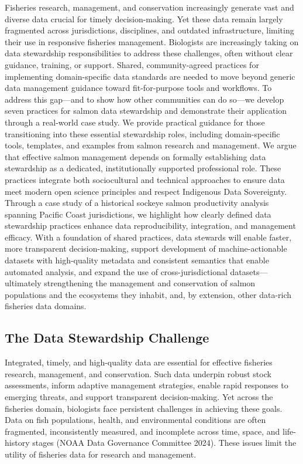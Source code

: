 \documentclass[
  letterpaper,
  DIV=11,
  numbers=noendperiod]{scrartcl}
\begin{document}
Fisheries research, management, and conservation increasingly generate
vast and diverse data crucial for timely decision-making. Yet these data
remain largely fragmented across jurisdictions, disciplines, and
outdated infrastructure, limiting their use in responsive fisheries
management. Biologists are increasingly taking on data stewardship
responsibilities to address these challenges, often without clear
guidance, training, or support. Shared, community-agreed practices for
implementing domain-specific data standards are needed to move beyond
generic data management guidance toward fit-for-purpose tools and
workflows. To address this gap---and to show how other communities can
do so---we develop seven practices for salmon data stewardship and
demonstrate their application through a real-world case study. We
provide practical guidance for those transitioning into these essential
stewardship roles, including domain-specific tools, templates, and
examples from salmon research and management. We argue that effective
salmon management depends on formally establishing data stewardship as a
dedicated, institutionally supported professional role. These practices
integrate both sociocultural and technical approaches to ensure data
meet modern open science principles and respect Indigenous Data
Sovereignty. Through a case study of a historical sockeye salmon
productivity analysis spanning Pacific Coast jurisdictions, we highlight
how clearly defined data stewardship practices enhance data
reproducibility, integration, and management efficacy. With a foundation
of shared practices, data stewards will enable faster, more transparent
decision-making, support development of machine-actionable datasets with
high-quality metadata and consistent semantics that enable automated
analysis, and expand the use of cross-jurisdictional
datasets---ultimately strengthening the management and conservation of
salmon populations and the ecosystems they inhabit, and, by extension,
other data-rich fisheries data domains.

\subsection{The Data Stewardship
Challenge}\label{the-data-stewardship-challenge}

Integrated, timely, and high-quality data are essential for effective
fisheries research, management, and conservation. Such data underpin
robust stock assessments, inform adaptive management strategies, enable
rapid responses to emerging threats, and support transparent
decision-making. Yet across the fisheries domain, biologists face
persistent challenges in achieving these goals. Data on fish
populations, health, and environmental conditions are often fragmented,
inconsistently measured, and incomplete across time, space, and
life-history stages (NOAA Data Governance Committee 2024). These issues
limit the utility of fisheries data for research and management.
\end{document}
